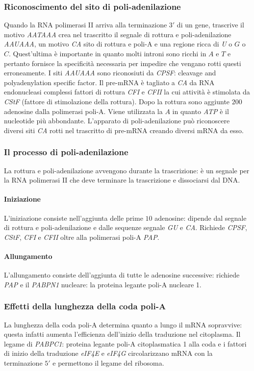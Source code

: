 \subsubsection{Riconoscimento del sito di poli-adenilazione}
Quando la RNA polimerasi II arriva alla terminazione $3'$ di un gene, trascrive il motivo \emph{AATAAA} crea nel trascritto il segnale di rottura e poli-adenilazione \emph{AAUAAA}, 
un motivo \emph{CA} sito di rottura e poli-A e una regione ricca di \emph{U} o $G$ o $C$. Quest'ultima \`e importante in quanto molti introni sono ricchi in $A$ e $T$ e pertanto 
fornisce la specificit\`a necessaria per impedire che vengano rotti questi erroneamente. I siti \emph{AAUAAA} sono riconosiuti da \emph{CPSF}: cleavage and polyadenylation specific 
factor. Il pre-mRNA \`e tagliato a \emph{CA} da RNA endonucleasi complessi fattori di rottura \emph{CFI} e \emph{CFII} la cui attivit\`a \`e stimolata da \emph{CStF} (fattore di 
stimolazione della rottura). Dopo la rottura sono aggiunte $200$ adenosine dalla polimerasi poli-A. Viene utilizzata la $A$ in quanto \emph{ATP} \`e il nucleotide pi\`u abbondante. 
L'apparato di poli-adenilazione pu\`o riconoscere diversi siti \emph{CA} rotti nel trascritto di pre-mRNA creando diversi mRNA da esso. 
\subsubsection{Il processo di poli-adenilazione}
La rottura e poli-adenilazione avvengono durante la trascrizione: \`e un segnale per la RNA polimerasi II che deve terminare la trascrizione e dissociarsi dal DNA. 
\paragraph{Iniziazione}
L'iniziazione consiste nell'aggiunta delle prime $10$ adenosine: dipende dal segnale di rottura e poli-adenilazione e dalle sequenze segnale \emph{GU} e \emph{CA}. Richiede 
\emph{CPSF}, \emph{CStF}, \emph{CFI} e \emph{CFII} oltre alla polimerasi poli-A \emph{PAP}. 
\paragraph{Allungamento}
L'allungamento consiste dell'aggiunta di tutte le adenosine successive: richiede \emph{PAP} e il \emph{PABPN1} nucleare: la proteina legante poli-A nucleare 1.
\subsubsection{Effetti della lunghezza della coda poli-A}
La lunghezza della coda poli-A determina quanto a lungo il mRNA sopravvive: questa infatti aumenta l'efficienza dell'inizio della traduzione nel citoplasma. Il legame di \emph{PABPC1}:
proteina legante poli-A citoplasmatica 1 alla coda e i fattori di inizio della traduzione \emph{eIF4E} e \emph{eIF4G} circolarizzano mRNA con la terminazione $5'$ e permettono il legame
del ribosoma. 
